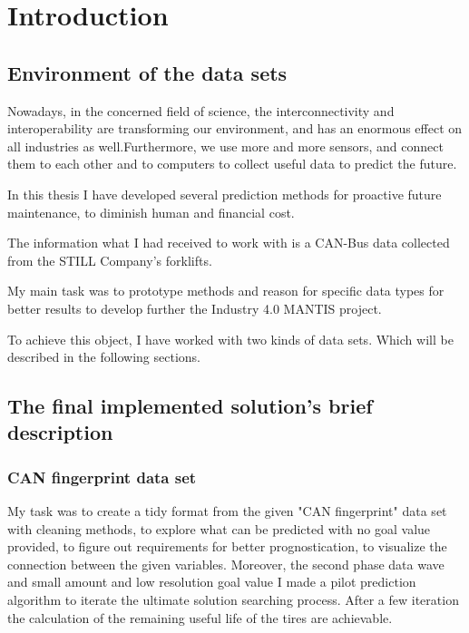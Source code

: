 \chapter*{Introduction}
\section{Environment of the data sets}
Nowadays, in the concerned field of science, the interconnectivity and interoperability are transforming our environment, and has an enormous effect on all industries as well.Furthermore, we use more and more sensors, and connect them to each other and to computers to collect useful data to predict the future.

In this thesis I have developed several prediction methods for proactive future maintenance, to diminish human and financial cost.

The information what I had received to work with is a CAN-Bus data collected from the STILL Company's forklifts.

My main task was to prototype methods and reason for specific data types for better results to develop further the Industry 4.0 MANTIS project.

To achieve this object, I have worked with two kinds of data sets. Which will be described in the following sections.
\section{The final implemented solution's brief description}
    \subsection{CAN fingerprint data set}
\noindent
My task was to create a tidy format from the given "CAN fingerprint" data set with cleaning methods, to explore what can be predicted with no goal value provided, to figure out requirements for better prognostication, to visualize the connection between the given variables. Moreover, the second phase data wave and small amount and low resolution goal value I made a pilot prediction algorithm to iterate the ultimate solution searching process. 
\noindent
After a few iteration the calculation of the remaining useful life of the tires are achievable.

